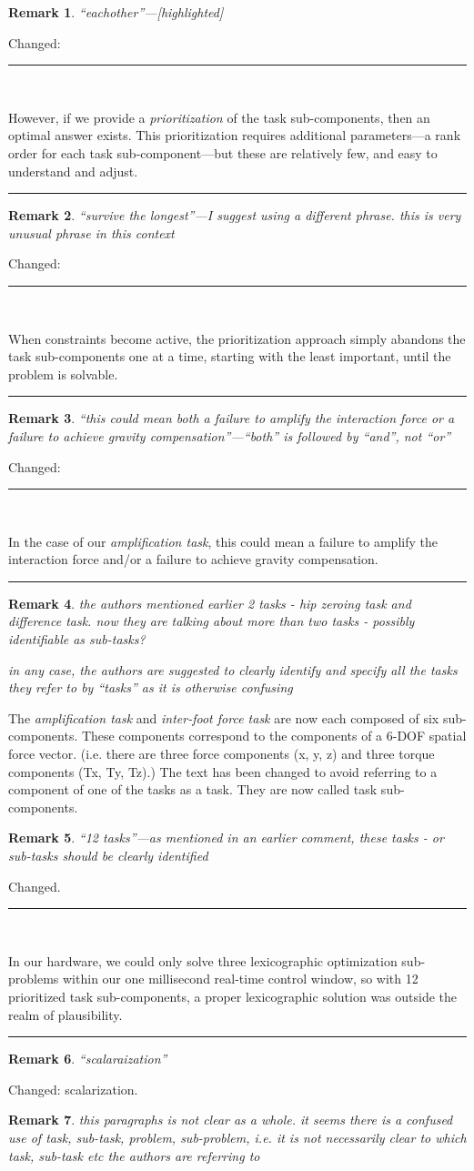 \documentclass[10pt,letterpaper]{letter}
\newcommand*{\ta}[1]{\textcolor[HTML]{107f10}{#1}}
\newcounter{reviewer}
\newtheorem{rev}{Remark}[reviewer]
\newcommand{\reviewer}[1]{\begin{rev} #1\end{rev}}
\newcommand{\response}[1]{\par{\hfill\begin{minipage}{\dimexpr\textwidth-2cm} #1\end{minipage}}}
\newcommand{\paperquote}[1]{%
	\begin{center}
		
		\begin{minipage}{.8\textwidth}
			{\rule{\textwidth}{.5pt}}\vspace{.5em}\\
			\begin{minipage}{\textwidth}\setlength{\parindent}{2em}#1\end{minipage}
			\vspace{.5em}
			{\rule{\textwidth}{.5pt}}
		\end{minipage}%
	\end{center}
}
\begin{document}
\begin{letter}{}
\reviewer{``eachother''---[highlighted]}
\response{Changed:}
\paperquote{
\ta{However, if we provide a \emph{prioritization} of the \ta{task sub-components}, then an optimal answer exists. This prioritization requires additional parameters---a rank order for each task sub-component---but these are relatively few, and easy to understand and adjust.}}

\reviewer{``survive the longest''---I suggest using a different phrase. this is very unusual phrase in this context}\response{Changed:}
\paperquote{
\ta{When constraints become active, the prioritization approach simply abandons the task sub-components one at a time, starting with the least important, until the problem is solvable.}
}

\reviewer{``this could mean both a failure to amplify the interaction force or a failure to achieve gravity compensation''---``both'' is followed by ``and'', not ``or''} \response{Changed:}
\paperquote{In the case of our \ta{\emph{amplification task}}, this could mean a failure to amplify the interaction force \ta{and/or} a failure to achieve gravity compensation.}

\reviewer{the authors mentioned earlier 2 tasks - hip zeroing task and difference task. now they are talking about more than two tasks - possibly identifiable as sub-tasks? 
	
in any case, the authors are suggested to clearly identify and specify all the tasks they refer to by ``tasks'' as it is otherwise confusing}
\response{The \ta{\emph{amplification task}} and \ta{\emph{inter-foot force task}} are now each composed of six sub-components. These components correspond to the components of a 6-DOF spatial force vector. (i.e. there are three force components (x, y, z) and three torque components (Tx, Ty, Tz).) The text has been changed to avoid referring to a component of one of the tasks as a task. They are now called task sub-components.}

\reviewer{``12 tasks''---as mentioned in an earlier comment, these tasks - or sub-tasks should be clearly identified}
\response{Changed.}
\paperquote{
In our hardware, we could \ta{only solve three lexicographic optimization sub-problems within our one millisecond real-time control window, so} with \ta{12 prioritized task sub-components, a proper lexicographic solution} was outside the realm of plausibility.
}

\reviewer{``scalaraization''}
\response{Changed: \ta{scalarization}.}

\reviewer{this paragraphs is not clear as a whole. it seems there is a confused use of task, sub-task, problem, sub-problem, i.e. it is not necessarily clear to which task, sub-task etc the authors are referring to
	
}
\end{letter}
\end{document}
